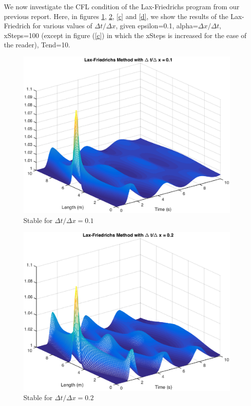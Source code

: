 We now investigate the CFL condition of the Lax-Friedrichs program from our previous report. Here, in figures \ref{a}, \ref{b}, \ref{c} and \ref{d}, we show the results of the Lax-Friedrich for various values of $\Delta t/\Delta x$, given epsilon=0.1, alpha=$\Delta x/\Delta t$, xSteps=100 (except in figure (\ref{c}) in which the xSteps is increased for the ease of the reader), Tend=10. 

\FloatBarrier
\begin{figure}
\begin{center}
\includegraphics[scale=0.6]{lax01.eps}
\caption{Stable for $\Delta t/\Delta x=0.1$}
\label{a}
\end{center}
\end{figure}

\begin{figure}
\begin{center}
\includegraphics[scale=0.6]{lax02.eps}
\caption{Stable for $\Delta t/\Delta x=0.2$}
\label{b}
\end{center}
\end{figure}

